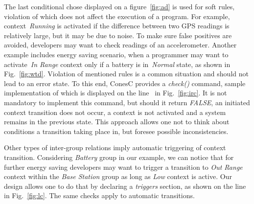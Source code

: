 The last conditional chose displayed on a figure~\ref{fig:ad} is used for soft rules, violation of
which does not affect the execution of a program. For example, context~\emph{Running} is
activated if the difference between two GPS readings is relatively large, but it may be due to noise.
To make sure false positives are avoided, developers may want to check
readings of an accelerometer. Another example includes energy saving scenario,
when a programmer may want to activate~\emph{In Range} context only if a battery is
in~\emph{Normal} state, as shown in Fig.~\ref{fig:wtd}.
Violation of mentioned rules is a common situation and should not lead to an error state.
To this end, ConesC provides a \emph{check()} command, sample implementation of which is
displayed on the line~ in Fig.~\ref{fig:irc}. It is not mandatory to implement this
command, but should it return \emph{FALSE}, an initiated context transition does not occur,
a context is not activated and a system remains in the previous state.
This approach allows one not to think about conditions a transition taking
place in, but foresee possible inconsistencies.



Other types of inter-group relations imply automatic triggering of context
transition. Considering \emph{Battery} group in our example, we can notice that
for further energy saving developers may want to trigger a transition to
\emph{Out Range} context within the \emph{Base Station} group as long as
\emph{Low} context is active. Our design allows one to do that by declaring a
\emph{triggers} section, as shown on the line~ in Fig.~\ref{fig:lc}.
The same checks apply to automatic transitions.


